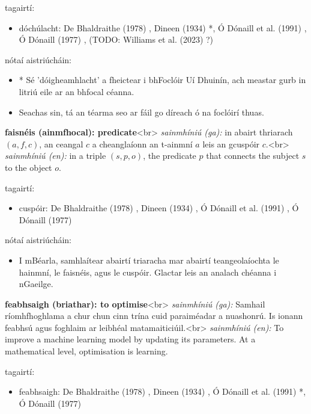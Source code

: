 \documentclass{article}
\begin{document}
tagairtí:
\begin{itemize}
	\item dóchúlacht: De Bhaldraithe (1978) \cite{de-bhaldraithe}, Dineen (1934) \cite{dineen}*, Ó Dónaill et al. (1991) \cite{focloir-beag}, Ó Dónaill (1977) \cite{odonaill}, (TODO: Williams et al. (2023) \cite{storchiste}?)
\end{itemize}

nótaí aistriúcháin:
\begin{itemize}
	\item * Sé 'dóigheamhlacht' a fheictear i bhFoclóir Uí Dhuinín, ach meastar gurb in litriú eile ar an bhfocal céanna.
	\item Seachas sin, tá an téarma seo ar fáil go díreach ó na foclóirí thuas.
\end{itemize}


\textbf{faisnéis (ainmfhocal): predicate}<br>
\textit{sainmhíniú (ga):} in abairt thriarach $(a,f,c)$, an ceangal $c$ a cheanglaíonn an t-ainmní $a$ leis an gcuspóir $c$.<br>
\textit{sainmhíniú (en):} in a triple $(s,p,o)$, the predicate $p$ that connects the subject $s$ to the object $o$.

tagairtí:
\begin{itemize}
	\item cuspóir: De Bhaldraithe (1978) \cite{de-bhaldraithe}, Dineen (1934) \cite{dineen}, Ó Dónaill et al. (1991) \cite{focloir-beag}, Ó Dónaill (1977) \cite{odonaill}
\end{itemize}

nótaí aistriúcháin:
\begin{itemize}
	\item I mBéarla, samhlaítear abairtí triaracha mar abairtí teangeolaíochta le hainmní, le faisnéis, agus le cuspóir. Glactar leis an analach chéanna i nGaeilge.
\end{itemize}


\textbf{feabhsaigh (briathar): to optimise}<br>
\textit{sainmhíniú (ga):} Samhail ríomhfhoghlama a chur chun cinn trína cuid paraiméadar a nuashonrú. Is ionann feabhsú agus foghlaim ar leibhéal matamaiticiúil.<br>
\textit{sainmhíniú (en):} To improve a machine learning model by updating its parameters. At a mathematical level, optimisation is learning.

tagairtí:
\begin{itemize}
	\item feabhsaigh: De Bhaldraithe (1978) \cite{de-bhaldraithe}, Dineen (1934) \cite{dineen}, Ó Dónaill et al. (1991) \cite{focloir-beag}*, Ó Dónaill (1977) \cite{odonaill}
\end{itemize}
\end{document}
